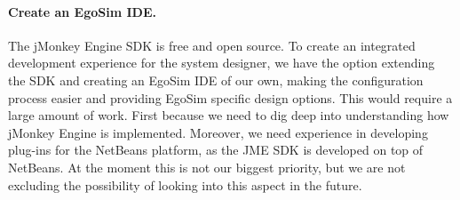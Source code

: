 \paragraph{Create an EgoSim IDE.} The jMonkey Engine SDK is free and open source. To create an integrated development experience for the system designer, we have the option extending the SDK and creating an EgoSim IDE of our own, making the configuration process easier and providing EgoSim specific design options. This would require a large amount of work. First because we need to dig deep into understanding how jMonkey Engine is implemented. Moreover, we need experience in developing plug-ins for the NetBeans platform, as the JME SDK is developed on top of NetBeans. At the moment this is not our biggest priority, but we are not excluding the possibility of looking into this aspect in the future.
